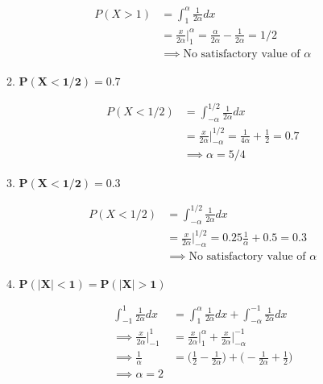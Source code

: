 \documentclass[10pt, oneside]{article}   	%
\theoremstyle{definition}
\begin{document}
\begin{enumerate}[label=4.\arabic*]
\begin{enumerate}
	\begin{align*}
	P(X > 1) &= \int^\alpha_1 \frac{1}{2\alpha} dx \\
	&= \frac{x}{2 \alpha} \Big|^\alpha_1 = \frac{\alpha}{2\alpha} - \frac{1}{2\alpha} = 1/2\\
	&\implies \boxed{\text{No satisfactory value of }\alpha}
	\end{align*}
	
	\item  \begin{tcolorbox}[
	  colback=Cerulean!5!white,
	  colframe=Cerulean!75!black]
	\textbf{$\bm{P(X < 1/2) = 0.7}$}
	\end{tcolorbox}
	
	\begin{align*}
	P(X < 1/2) &= \int^{1/2}_{-\alpha} \frac{1}{2\alpha} dx \\
	&= \frac{x}{2\alpha} \Big|^{1/2}_{-\alpha} = \frac{1}{4\alpha} + \frac{1}{2} = 0.7 \\
	&\implies \boxed{\alpha = 5/4}
	\end{align*}
	
	\item  \begin{tcolorbox}[
	  colback=Cerulean!5!white,
	  colframe=Cerulean!75!black]
	\textbf{$\bm{P(X < 1/2) = 0.3}$}
	\end{tcolorbox}
	
	\begin{align*}
	P(X < 1/2) &= \int^{1/2}_{-\alpha} \frac{1}{2\alpha} dx \\
	&= \frac{x}{2\alpha} \Big|^{1/2}_{-\alpha} = 0.25 \frac{1}{\alpha} + 0.5 = 0.3 \\
	&\implies \boxed{\text{No satisfactory value of }\alpha}
	\end{align*}
	
	\item  \begin{tcolorbox}[
	  colback=Cerulean!5!white,
	  colframe=Cerulean!75!black]
	\textbf{$\bm{P(|X| < 1) = P(|X| > 1)}$}
	\end{tcolorbox}
	
	\begin{align*}
	\int^1_{-1} \frac{1}{2\alpha} dx &= \int^\alpha_1 \frac{1}{2\alpha} dx + \int^{-1}_{-\alpha} \frac{1}{2\alpha} dx \\
	\implies \frac{x}{2\alpha} \Big|^1_{-1} &= \frac{x}{2\alpha} \Big|^\alpha_1 + \frac{x}{2\alpha} \Big|^{-1}_{-\alpha} \\
	\implies \frac{1}{\alpha} &= \Bigg( \frac{1}{2} - \frac{1}{2\alpha} \Bigg) + \Bigg( -\frac{1}{2\alpha} + \frac{1}{2} \Bigg) \\
	\implies \boxed{\alpha = 2}
	\end{align*}
	

\end{enumerate}
\end{enumerate}
\end{document}
